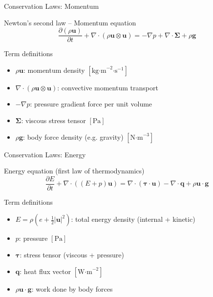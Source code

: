 \begin{secframe}
\small
\textcolor{red_unipd}{\Large Conservation Laws: Momentum}

\vspace{0.8em}

\begin{alertblock}{Newton’s second law -- Momentum equation}
\[
\dfrac{\partial (\rho \mathbf{u})}{\partial t}
+ \nabla\!\cdot\!(\rho \mathbf{u}\otimes\mathbf{u})
= -\nabla p + \nabla\!\cdot\!\boldsymbol{\Sigma} + \rho \mathbf{g}
\]
\end{alertblock}

\begin{block}{Term definitions}
\begin{itemize}
  \item \(\rho \mathbf{u}\): momentum density \([\text{kg·m}^{-2}\text{·s}^{-1}]\)
  \item \(\nabla\!\cdot\!(\rho \mathbf{u}\otimes\mathbf{u})\): convective momentum transport
  \item \(-\nabla p\): pressure gradient force per unit volume
  \item \(\boldsymbol{\Sigma}\): viscous stress tensor \([\text{Pa}]\)
  \item \(\rho \mathbf{g}\): body force density (e.g. gravity) \([\text{N·m}^{-3}]\)
\end{itemize}
\end{block}
\end{secframe}




\begin{secframe}
\small
\textcolor{red_unipd}{\Large Conservation Laws: Energy}

\vspace{0.8em}

\begin{alertblock}{Energy equation (first law of thermodynamics)}
\[
\dfrac{\partial E}{\partial t}
+ \nabla\!\cdot\!((E+p)\mathbf{u})
= \nabla\!\cdot\!(\boldsymbol{\tau}\!\cdot\!\mathbf{u})
- \nabla\!\cdot\!\mathbf{q}
+ \rho \mathbf{u}\!\cdot\!\mathbf{g}
\]
\end{alertblock}

\begin{block}{Term definitions}
\begin{itemize}
  \item \(E = \rho\!\left(e + \tfrac{1}{2}|\mathbf{u}|^2\right)\): total energy density (internal + kinetic)
  \item \(p\): pressure \([\text{Pa}]\)
  \item \(\boldsymbol{\tau}\): stress tensor (viscous + pressure)
  \item \(\mathbf{q}\): heat flux vector \([\text{W·m}^{-2}]\)
  \item \(\rho \mathbf{u}\!\cdot\!\mathbf{g}\): work done by body forces
\end{itemize}
\end{block}
\end{secframe}





